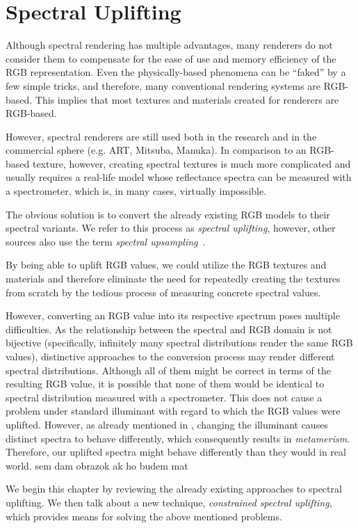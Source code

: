 \chapter{Spectral Uplifting}

Although spectral rendering has multiple advantages, many renderers do not consider them to compensate for the ease of use and memory efficiency of the RGB representation. Even the physically-based phenomena can be ``faked'' by a few simple tricks, and therefore, many conventional rendering systems are RGB-based. This implies that most textures and materials created for renderers are RGB-based.

However, spectral renderers are still used both in the research and in the commercial sphere (e.g. ART, Mitsuba, Manuka). In comparison to an RGB-based texture, however, creating spectral textures is much more complicated and usually requires a real-life model whose reflectance spectra can be measured with a spectrometer, which is, in many cases, virtually impossible. 

The obvious solution is to convert the already existing RGB models to their spectral variants. We refer to this process as \emph{spectral uplifting}, however, other sources also use the term \emph{spectral upsampling}~\cite{sigmoidMethod}. 

By being able to uplift RGB values, we could utilize the RGB textures and materials and therefore eliminate the need for repeatedly creating the textures from scratch by the tedious process of measuring concrete spectral values.

However, converting an RGB value into its respective spectrum poses multiple difficulties. As the relationship between the spectral and RGB domain is not bijective (specifically, infinitely many spectral distributions render the same RGB values), distinctive approaches to the conversion process may render different spectral distributions. Although all of them might be correct in terms of the resulting RGB value, it is possible that none of them would be identical to spectral distribution measured with a spectrometer. This does not cause a problem under standard illuminant with regard to which the RGB values were uplifted. However, as already mentioned in , changing the illuminant causes distinct spectra to behave differently, which consequently results in \emph{metamerism}. Therefore, our uplifted spectra might behave differently than they would in real world. sem dam obrazok ak ho budem mat

We begin this chapter by reviewing the already existing approaches to spectral uplifting. We then talk about a new technique, \emph{constrained spectral uplifting}, which provides means for solving the above mentioned problems.

